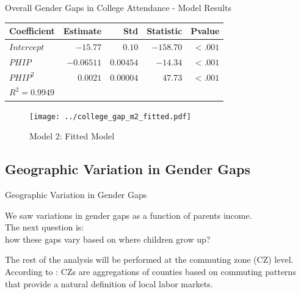 \documentclass{beamer}
\begin{document}
\begin{frame}{Overall Gender Gaps in College Attendance - Model Results}

\begin{table}[ht]
	\centering
	\begin{tabular}{lrrrr}
		\hline
		Coefficient & Estimate & Std & Statistic & Pvalue \\ 
		\hline
		$Intercept$ & $-15.77$ & $0.10$ & $-158.70$ & $<.001$ \\ 
		$PHIP$ & $-0.06511$ & $0.00454$ & $-14.34$ & $<.001$ \\ 
		$PHIP^2$ & $0.0021$ & $0.00004$ & $47.73$ & $<.001$ \\ 
		\hline
		$R^2= 0.9949$
	\end{tabular}
\end{table}



	\begin{figure}
	\centering
	\texttt{[image: ../college\_gap\_m2\_fitted.pdf]}
	\caption{{\scriptsize Model 2: Fitted Model}}
\end{figure}	

\end{frame}

\subsection{Geographic Variation in Gender Gaps}

\begin{frame}{Geographic Variation in Gender Gaps}
\begin{block}{}
	\centering
	We saw variations in gender gaps as a function of parents income. \\
	The next question is: \\
	how these gaps vary based on where children grow up?
\end{block}

The rest of the analysis will be performed at the commuting zone (CZ) level. According to \cite{chetty2016childhood}: CZs are aggregations of counties based on commuting patterns that provide a natural definition of local labor markets.
 
\end{frame}
\end{document}
